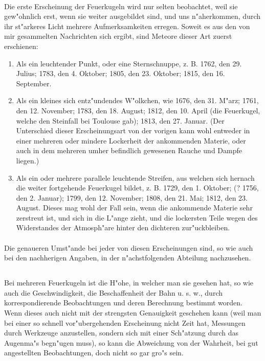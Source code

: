 \documentclass[a4paper, 11pt, oneside, polutonikogreek, german]{article}
\begin{document}
\paragraph{}
Die erste Erscheinung der Feuerkugeln wird nur selten beobachtet, weil sie gew"ohnlich erst, wenn sie weiter ausgebildet sind, und uns n"aherkommen, durch ihr st"arkeres Licht mehrere Aufmerksamkeiten erregen. Soweit es aus den von mir gesammelten Nachrichten sich ergibt, sind Meteore dieser Art zuerst erschienen:
\begin{enumerate}
    \item Als ein leuchtender Punkt, oder eine Sternschnuppe, z. B. 1762, den 29. Julius; 1783, den 4. Oktober; 1805, den 23. Oktober; 1815, den 16. September.
    \item Als ein kleines sich entz"undendes W"olkchen, wie 1676, den 31. M"arz; 1761, den 12. November; 1783, den 18. August; 1812, den 10. April (die Feuerkugel, welche den Steinfall bei Toulouse gab); 1813, den 27. Januar. (Der Unterschied dieser Erscheinungsart von der vorigen kann wohl entweder in einer mehreren oder mindere Lockerheit der ankommenden Materie, oder auch in dem mehreren umher befindlich gewesenen Rauche und Dampfe liegen.)
    \item Als ein oder mehrere parallele leuchtende Streifen, aus welchen sich hernach die weiter fortgehende Feuerkugel bildet, z. B. 1729, den 1. Oktober; (? 1756, den 2. Januar); 1799, den 12. November; 1808, den 21. Mai; 1812, den 23. August. Dieses mag wohl der Fall sein, wenn die ankommende Materie sehr zerstreut ist, und sich in die L"ange zieht, und die lockersten Teile wegen des Widerstandes der Atmosph"are hinter den dichteren zur"uckbleiben.
\end{enumerate}
\paragraph{}
Die genaueren Umst"ande bei jeder von diesen Erscheinungen sind, so wie auch bei den nachherigen Angaben, in der n"achstfolgenden Abteilung nachzusehen.
\subsection{}
\paragraph{}
Bei mehreren Feuerkugeln ist die H"ohe, in welcher man sie gesehen hat, so wie auch die Geschwindigkeit, die Beschaffenheit der Bahn u. s. w., durch korrespondierende Beobachtungen und deren Berechnung bestimmt worden. Wenn dieses auch nicht mit der strengsten Genauigkeit geschehen kann (weil man bei einer so schnell vor"ubergehenden Erscheinung nicht Zeit hat, Messungen durch Werkzeuge anzustellen, sondern sich mit einer Sch"atzung durch das Augenma"s begn"ugen muss), so kann die Abweichung von der Wahrheit, bei gut angestellten Beobachtungen, doch nicht so gar gro"s sein.
\end{document}
